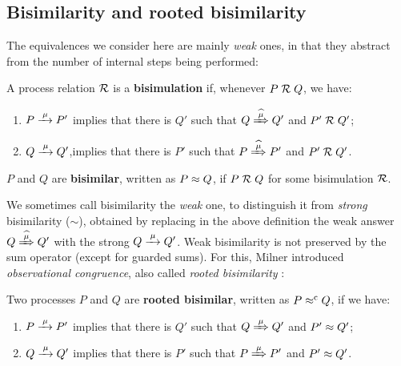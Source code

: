 \subsection{Bisimilarity and rooted bisimilarity}
\label{ss:BiEx}

The equivalences we consider here are mainly \emph{weak} ones, in that they
abstract from the number of internal steps being performed:
\begin{definition}%
\label{d:wb}
A process relation ${{\cal R}}$ is a \textbf{bisimulation} if, whenever
 $P\mathrel{\cal R} Q$, %
we have:
\begin{enumerate}
\item $P \arr\mu P'$ implies that there is $Q'$ such that $Q \Arcap \mu Q'$ and $P' \mathrel{\cal R} Q'$;
\item $Q \arr\mu Q'$,implies that there is $P'$ such that $P \Arcap
  \mu P'$ and $P' \mathrel{\cal R} Q'$\enspace.
\end{enumerate}  
 $P$ and $Q$ are \textbf{bisimilar},
written as $P \approx Q$, if $P \mathrel{\cal R} Q$ for some bisimulation ${\cal R}$.
\end{definition}

We sometimes call bisimilarity the \emph{weak} one, to
distinguish it from \emph{strong} bisimilarity ($\sim$),
obtained by replacing in the above definition   the weak answer $
Q\Arcap\mu Q'$ with the strong  $Q \arr \mu Q'$.
Weak bisimilarity is not preserved by the sum operator (except for
guarded sums). For this, Milner introduced \emph{observational congruence}, also called \emph{rooted
  bisimilarity} \cite{Gorrieri:2015jt,Sangiorgi:2011ut}:
\begin{definition}%
\label{d:rootedBisimilarity}
Two processes $P$ and $Q$ are \textbf{rooted bisimilar}, written as $P
\mathrel{\approx^{\rm{c}}} Q$, if we have:
\begin{enumerate}
 \item  $P \arr\mu P'$ implies that there is $Q'$ such that $Q
   \Arr\mu Q'$ and $P' \approx Q'$;
 \item  $Q \arr\mu Q'$ implies that there is $P'$ such that $P
   \Arr\mu P'$ and $P' \approx Q'$\enspace.
\end{enumerate}
\end{definition}

